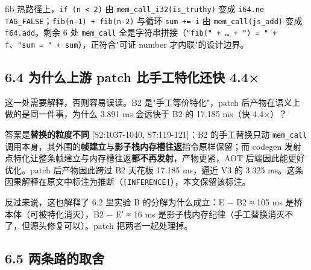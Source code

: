 \documentclass[11pt, a4paper]{article}
\begin{document}
fib 热路径上，\texttt{if (n < 2)} 由 \texttt{mem\_call\_i32(is\_truthy)} 变成 \texttt{i64.ne TAG\_FALSE}；\texttt{fib(n-1) + fib(n-2)} 与循环 \texttt{sum += i} 由 \texttt{mem\_call(js\_add)} 变成 \texttt{f64.add}。剩余 6 处 \texttt{mem\_call} 全是字符串拼接（\texttt{"fib(" + … + ") = " + f}、\texttt{"sum = " + sum}），正符合"可证 number 才内联"的设计边界。


\subsection{6.4 为什么上游 patch 比手工特化还快 4.4×}

这一处需要解释，否则容易误读。B2 是"手工等价特化"，patch 后产物在语义上做的是同一件事，为什么 3.891 ms 会远快于 B2 的 17.185 ms（快 4.4×）？


答案是\textbf{替换的粒度不同} [S2:1037-1040, S7:119-121]：B2 的手工替换只动 \texttt{mem\_call} 调用本身，其外围的\textbf{帧建立}与\textbf{影子栈内存槽往返}指令原样保留；而 codegen 发射点特化让整条帧建立与内存槽往返\textbf{都不再发射}，产物更紧，AOT 后端因此能更好优化。patch 后产物因此跨过 B2 天花板 17.185 ms，逼近 V3 的 3.325 ms。这条因果解释在原文中标注为推断（\texttt{[INFERENCE]}），本文保留该标注。


反过来说，这也解释了 6.2 里实验 B 的分解为什么成立：E − B2 ≈ 105 ms 是桥本体（可被特化消灭），B2 − E′ ≈ 16 ms 是影子栈内存纪律（手工替换消灭不了，但源头修复可以）。patch 把两者一起处理掉。


\subsection{6.5 两条路的取舍}
\end{document}
